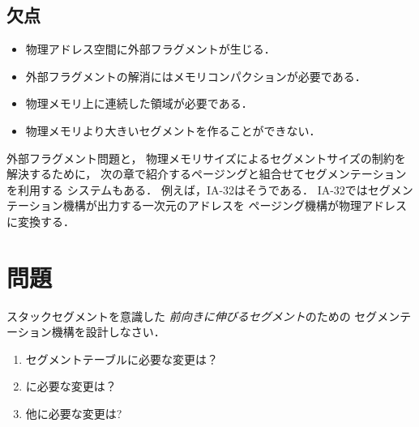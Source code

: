 \subsection*{欠点}
\begin{itemize}
\item 物理アドレス空間に外部フラグメントが生じる．
\item 外部フラグメントの解消にはメモリコンパクションが必要である．
\item 物理メモリ上に連続した領域が必要である．
\item 物理メモリより大きいセグメントを作ることができない．
\end{itemize}

外部フラグメント問題と，
物理メモリサイズによるセグメントサイズの制約を解決するために，
次の章で紹介するページングと組合せてセグメンテーションを利用する
システムもある．
例えば，IA-32はそうである．
IA-32ではセグメンテーション機構が出力する一次元のアドレスを
ページング機構が物理アドレスに変換する．

\newpage
\section*{問題}
スタックセグメントを意識した
\emph{前向きに伸びるセグメント}のための
セグメンテーション機構を設計しなさい．

\begin{enumerate}
\item セグメントテーブルに必要な変更は？
\item {}に必要な変更は？
\item 他に必要な変更は?
\end{enumerate}
